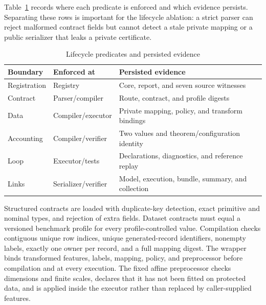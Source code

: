 Table~\ref{tab:ch3-lifecycle-evidence} records where each predicate is enforced and
which evidence persists.  Separating these rows is important for the lifecycle
ablation: a strict parser can reject malformed contract fields but cannot detect a
stale private mapping or a public serializer that leaks a private certificate.

\begin{table}[tbp]
    \centering
    \caption{Lifecycle predicates and persisted evidence}
    \label{tab:ch3-lifecycle-evidence}
    \small
    \setlength{\tabcolsep}{3pt}
    \renewcommand{\arraystretch}{1.15}
    \begin{tabular}{@{}
        >{\raggedright\arraybackslash}p{}
        >{\raggedright\arraybackslash}p{}
        >{\raggedright\arraybackslash}p{}@{}}
        \toprule
        \textbf{Boundary} &
        \textbf{Enforced at} &
        \textbf{Persisted evidence} \\
        \midrule
        Registration &
        Registry &
        Core, report, and seven source witnesses \\

        Contract &
        Parser/compiler &
        Route, contract, and profile digests \\

        Data &
        Compiler/executor &
        Private mapping, policy, and transform bindings \\

        Accounting &
        Compiler/verifier &
        Two values and theorem/configuration identity \\

        Loop &
        Executor/tests &
        Declarations, diagnostics, and reference replay \\

        Links &
        Serializer/verifier &
        Model, execution, bundle, summary, and collection \\
        \bottomrule
    \end{tabular}
\end{table}

Structured contracts are loaded with duplicate-key detection, exact primitive and
nominal types, and rejection of extra fields.  Dataset contracts must equal a
versioned benchmark profile for every profile-controlled value.  Compilation
checks contiguous unique row indices, unique generated-record identifiers,
nonempty labels, exactly one owner per record, and a full mapping digest.  The
wrapper binds transformed features, labels, mapping, policy, and preprocessor
before compilation and at every execution.  The fixed affine preprocessor checks
dimensions and finite scales, declares that it has not been fitted on protected
data, and is applied inside the executor rather than replaced by caller-supplied
features.

